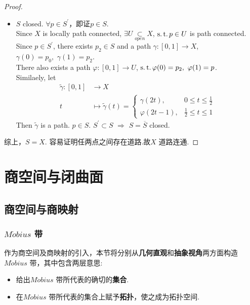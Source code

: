 \begin{proposition}
\begin{proof}
\begin{itemize}
				\item $S$ closed. $\forall p \in S^{'}$，即证$p \in S$.\\
				Since $X$ is locally path connected, $\exists U \underset{open}{\subset} X$, $\operatorname{s.t.} p \in U$ is path connected.\\
				Since $p \in S^{'}$, there exists $p_2 \in S$ and a path $\gamma : [0 , 1] \longrightarrow X$, $\gamma(0) = p_0 , \,\, \gamma(1) = p_2$.\\
				There also exists a path $\varphi : [0 , 1] \longrightarrow U$, $\operatorname{s.t.} \varphi(0) = p_2 , \,\, \varphi(1) = p$.\\
				Similaely, let 
				\begin{align}
					\widetilde{\gamma} : [0 , 1] &\longrightarrow X \\
					t &\longmapsto \widetilde{\gamma}(t) = 
					\begin{cases}
						\gamma(2t) , \,\, &0 \leq t \leq \frac{1}{2}\\
						\varphi(2t - 1) , &\frac{1}{2} \leq t \leq 1
					\end{cases}
				\end{align}
				Then $\widetilde{\gamma}$ is a path. $p \in S$. $S^{'} \subset S$ $\Rightarrow$ $S = \overline{S}$ closed.
			\end{itemize}
			综上，$S = X$. 容易证明任两点之间存在道路.故$X$ 道路连通.
		\end{proof}
	\end{proposition}

\chapter{商空间与闭曲面}
\section{商空间与商映射}
\subsection{$M\ddot{o}bius$ 带}
	 作为商空间及商映射的引入，本节将分别从\textbf{几何直观}和\textbf{抽象视角}两方面构造$M\ddot{o}bius$ 带，其中包含两层意思:
	 \begin{itemize}
	 	\item 给出$M\ddot{o}bius$ 带所代表的确切的\textbf{集合}.
	 	
	 	\item 在$M\ddot{o}bius$ 带所代表的集合上赋予\textbf{拓扑}，使之成为拓扑空间.
 	\end{itemize}
 
